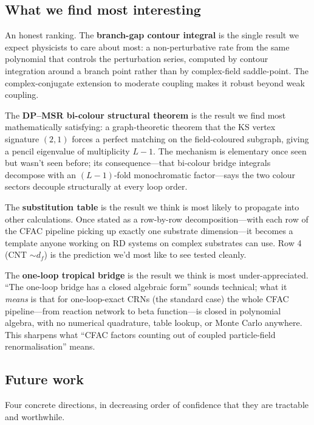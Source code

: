\documentclass[11pt,a4paper]{article}
\theoremstyle{plain}
\begin{document}
\subsection{What we find most interesting}
\label{sec:interesting}

An honest ranking.  The \textbf{branch-gap contour integral} is
the single result we expect physicists to care about most: a
non-perturbative rate from the same polynomial that controls the
perturbation series, computed by contour integration around a
branch point rather than by complex-field saddle-point.  The
complex-conjugate extension to moderate coupling makes it robust
beyond weak coupling.

The \textbf{DP--MSR bi-colour structural theorem} is the result
we find most mathematically satisfying: a graph-theoretic
theorem that the KS vertex signature $(2, 1)$ forces a perfect
matching on the field-coloured subgraph, giving a pencil
eigenvalue of multiplicity $L - 1$.  The mechanism is elementary
once seen but wasn't seen before; its consequence---that
bi-colour bridge integrals decompose with an $(L-1)$-fold
monochromatic factor---says the two colour sectors decouple
structurally at every loop order.

The \textbf{substitution table} is the result we think is most
likely to propagate into other calculations.  Once stated as a
row-by-row decomposition---with each row of the CFAC pipeline
picking up exactly one substrate dimension---it becomes a
template anyone working on RD systems on complex substrates can
use.  Row 4 (CNT $\sim d_f$) is the prediction we'd most like to
see tested cleanly.

The \textbf{one-loop tropical bridge} is the result we think is
most under-appreciated.  ``The one-loop bridge has a closed
algebraic form'' sounds technical; what it \emph{means} is that
for one-loop-exact CRNs (the standard case) the whole CFAC
pipeline---from reaction network to beta function---is closed in
polynomial algebra, with no numerical quadrature, table lookup,
or Monte Carlo anywhere.  This sharpens what ``CFAC factors
counting out of coupled particle-field renormalisation'' means.

\subsection{Future work}
\label{sec:future}

Four concrete directions, in decreasing order of confidence that
they are tractable and worthwhile.
\end{document}
